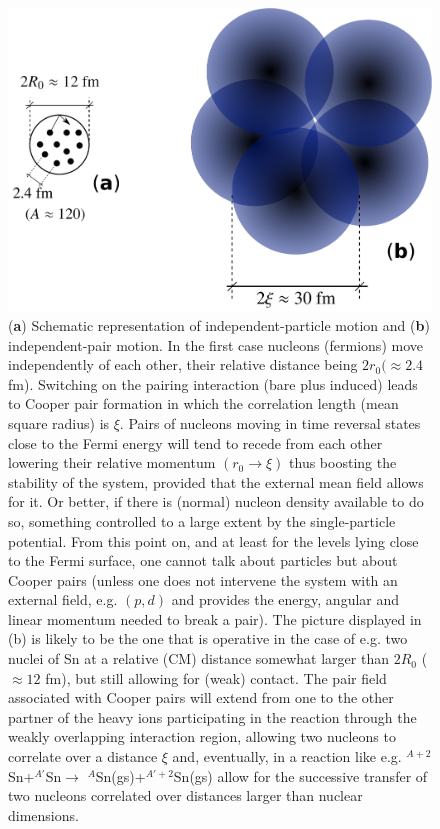 \begin{figure}
\centerline{\includegraphics*[width=12cm,angle=0]{nutshell/figs/fig3_1_4.pdf}}
\caption{(\textbf{a}) Schematic representation of independent-particle motion and (\textbf{b}) independent-pair motion. In the first case nucleons (fermions) move independently of each other, their relative distance being $2r_0(\approx 2.4$ fm).  Switching on the pairing interaction (bare plus induced) leads to Cooper pair formation in which the correlation length (mean square radius) is $\xi$. Pairs of nucleons moving in time reversal states close to the Fermi energy will tend to recede from each other lowering their relative momentum $(r_0\rightarrow \xi)$ thus boosting the stability of the system, provided that the external mean field allows for it. Or better, if  there is (normal) nucleon density available to do so, something controlled to a large extent by the single-particle potential. From this point on, and at least for the levels lying close to the Fermi surface, one cannot talk about particles but about Cooper pairs (unless one does not intervene the system with an external field, e.g. $(p,d)$ and provides the energy, angular and linear momentum needed to break a pair). The picture displayed in (b) is likely to be the one that is operative in the case of e.g. two nuclei of  Sn at a relative (CM) distance somewhat larger than $2R_0$ ($\approx 12$ fm), but still allowing for  (weak) contact. The pair field associated with  Cooper pairs will extend from one to the other partner of the heavy ions participating in the reaction through the weakly overlapping interaction region, allowing two nucleons to correlate over a distance $\xi$ and, eventually, in a reaction like e.g. $^{A+2}$Sn+$^{A'}$Sn$\rightarrow$ $^{A}$Sn(gs)+$^{A'+2}$Sn(gs) allow for the successive transfer of two nucleons correlated over distances larger than nuclear dimensions.}\label{fig3.2.1}
\end{figure}
